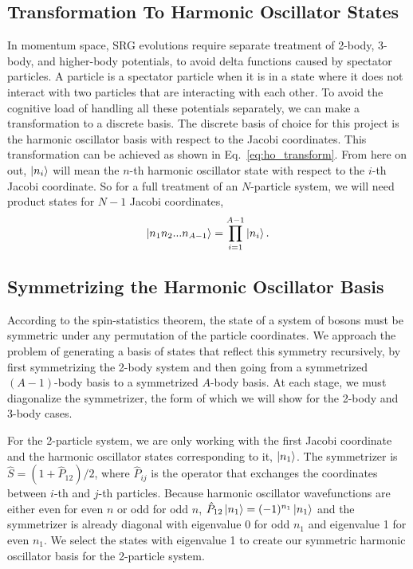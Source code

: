 \subsection{Transformation To Harmonic Oscillator States}

In momentum space, SRG evolutions require separate treatment of 2-body, 3-body, and higher-body potentials, to avoid delta functions caused by spectator particles. A particle is a spectator particle when it is in a state where it does not interact with two particles that are interacting with each other. To avoid the cognitive load of handling all these potentials separately, we can make a transformation to a discrete basis. The discrete basis of choice for this project is the harmonic oscillator basis with respect to the Jacobi coordinates. This transformation can be achieved as shown in Eq.~\ref{eq:ho_transform}. From here on out, $\ket{n_i}$ will mean the $n$-th harmonic oscillator state with respect to the $i$-th Jacobi coordinate. So for a full treatment of an $N$-particle system, we will need product states for $N-1$ Jacobi coordinates,
\begin{equation}
\ket{n_1 n_2 ... n_{A-1}} = \prod_{i=1}^{A-1}\ket{n_i}.
\end{equation}

\subsection{Symmetrizing the Harmonic Oscillator Basis}

According to the spin-statistics theorem, the state of a system of bosons must be symmetric under any permutation of the particle coordinates. We approach the problem of generating a basis of states that reflect this symmetry recursively, by first symmetrizing the 2-body system and then going from a symmetrized $(A-1)$-body basis to a symmetrized $A$-body basis. At each stage, we must diagonalize the symmetrizer, the form of which we will show for the 2-body and 3-body cases.

For the 2-particle system, we are only working with the first Jacobi coordinate and the harmonic oscillator states corresponding to it, $\ket{n_1}$. The symmetrizer is $\hat{S} = (1 + \hat{P}_{12})/2$, where $\hat{P}_{ij}$ is the operator that exchanges the coordinates between $i$-th and $j$-th particles. Because harmonic oscillator wavefunctions are either even for even $n$ or odd for odd $n$, $\hat{P}_{12} \ket{n_1} = (-1)^{n_1} \ket{n_1}$ and the symmetrizer is already diagonal with eigenvalue 0 for odd $n_1$ and eigenvalue 1 for even $n_1$. We select the states with eigenvalue 1 to create our symmetric harmonic oscillator basis for the 2-particle system.

